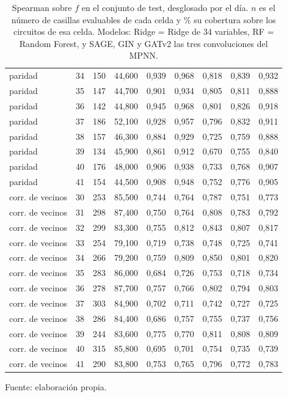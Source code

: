 \begin{table}[htbp]
{\begin{tabular}{@{}lrrrrrrrr@{}}
        paridad & 34 & 150 & 44,600 & 0,939 & 0,968 & 0,818 & 0,839 & 0,932 \\
        paridad & 35 & 147 & 44,700 & 0,901 & 0,934 & 0,805 & 0,811 & 0,888 \\
        paridad & 36 & 142 & 44,800 & 0,945 & 0,968 & 0,801 & 0,826 & 0,918 \\
        paridad & 37 & 186 & 52,100 & 0,928 & 0,957 & 0,796 & 0,832 & 0,911 \\
        paridad & 38 & 157 & 46,300 & 0,884 & 0,929 & 0,725 & 0,759 & 0,888 \\
        paridad & 39 & 134 & 45,900 & 0,861 & 0,912 & 0,670 & 0,755 & 0,840 \\
        paridad & 40 & 176 & 48,000 & 0,906 & 0,938 & 0,733 & 0,768 & 0,907 \\
        paridad & 41 & 154 & 44,500 & 0,908 & 0,948 & 0,752 & 0,776 & 0,905 \\
        corr. de vecinos & 30 & 253 & 85,500 & 0,744 & 0,764 & 0,787 & 0,751 & 0,773 \\
        corr. de vecinos & 31 & 298 & 87,400 & 0,750 & 0,764 & 0,808 & 0,783 & 0,792 \\
        corr. de vecinos & 32 & 299 & 83,300 & 0,755 & 0,812 & 0,843 & 0,807 & 0,817 \\
        corr. de vecinos & 33 & 254 & 79,100 & 0,719 & 0,738 & 0,748 & 0,725 & 0,741 \\
        corr. de vecinos & 34 & 266 & 79,200 & 0,759 & 0,809 & 0,850 & 0,801 & 0,820 \\
        corr. de vecinos & 35 & 283 & 86,000 & 0,684 & 0,726 & 0,753 & 0,718 & 0,734 \\
        corr. de vecinos & 36 & 278 & 87,700 & 0,757 & 0,766 & 0,802 & 0,794 & 0,803 \\
        corr. de vecinos & 37 & 303 & 84,900 & 0,702 & 0,711 & 0,742 & 0,727 & 0,725 \\
        corr. de vecinos & 38 & 286 & 84,400 & 0,686 & 0,757 & 0,755 & 0,737 & 0,756 \\
        corr. de vecinos & 39 & 244 & 83,600 & 0,775 & 0,770 & 0,811 & 0,808 & 0,809 \\
        corr. de vecinos & 40 & 315 & 85,800 & 0,695 & 0,701 & 0,754 & 0,735 & 0,739 \\
        corr. de vecinos & 41 & 290 & 83,800 & 0,753 & 0,765 & 0,796 & 0,772 & 0,783 \\
        \bottomrule
    \end{tabular}}

    \caption{Spearman sobre $f$ en el conjunto de test, desglosado por el día. $n$ es el número de casillas evaluables de cada celda y \% su cobertura sobre los circuitos de esa celda. Modelos: Ridge = Ridge de 34 variables, RF = Random Forest, y SAGE, GIN y GATv2 las tres convoluciones del MPNN.}
    \label{tab:v2_tiempo_spearman_f}

    {\footnotesize Fuente: elaboración propia.}
\end{table}
